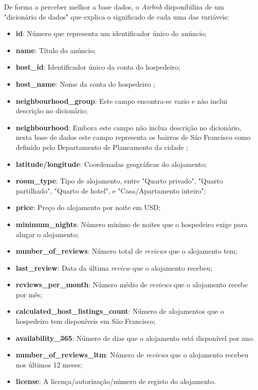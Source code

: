 \documentclass[a4paper, justified]{tufte-handout}\usepackage[]{graphicx}\usepackage[]{xcolor}
\begin{document}
De forma a perceber melhor a base dados, o \textit{Airbnb} disponibiliza de um "dicionário de dados"\cite{DicDadosAirBnb} que explica o significado de cada uma das variáveis:

\begin{itemize}
  \item \textbf{id}: Número que representa um identificador único do anúncio;
  \item \textbf{name}: Título do anúncio;
  \item \textbf{host\_id}: Identificador único da conta do hospedeiro;
  \item \textbf{host\_name}: Nome da conta do hospedeiro ;
  \item \textbf{neighbourhood\_group}: Este campo encontra-se vazio e não inclui descrição no dicionário;
  \item \textbf{neighbourhood}: Embora este campo não inclua descrição no dicionário, nesta base de dados este campo representa os bairros de São Francisco como definido pelo Departamento de Planeamento da cidade ;
  \item \textbf{latitude/longitude}: Coordenadas geográficas do alojamento;
  \item \textbf{room\_type}: Tipo de alojamento, entre "Quarto privado", "Quarto partilhado", "Quarto de hotel", e "Casa/Apartamento inteiro";
  \item \textbf{price}: Preço do alojamento por noite em USD;
  \item \textbf{minimum\_nights}: Número mínimo de noites que o hospedeiro exige para alugar o alojamento;
  \item \textbf{number\_of\_reviews}: Número total de \textit{reviews} que o alojamento tem;
  \item \textbf{last\_review}: Data da última \textit{review} que o alojamento recebeu;
  \item \textbf{reviews\_per\_month}: Número médio de \textit{reviews} que o alojamento recebe por mês;
  \item \textbf{calculated\_host\_listings\_count}: Número de alojamentos que o hospedeiro tem disponíveis em São Francisco;
  \item \textbf{availability\_365}: Número de dias que o alojamento está disponível por ano.
  \item \textbf{number\_of\_reviews\_ltm}: Número de \textit{reviews} que o alojamento recebeu nos últimos 12 meses;
  \item \textbf{license}: A licença/autorização/número de registo do alojamento.
\end{itemize}
\end{document}
